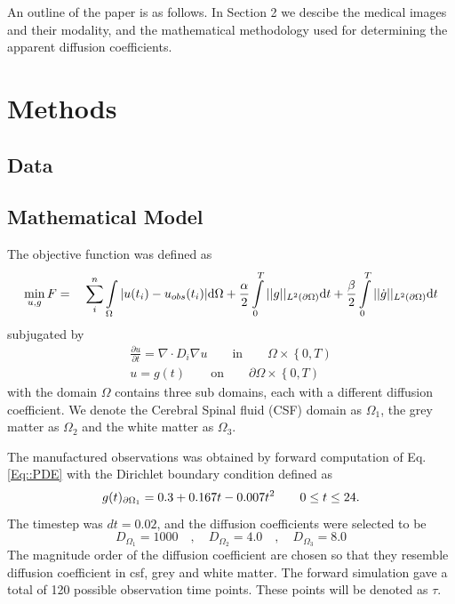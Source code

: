 \documentclass[11pt,a4paper]{article}
\begin{document}
An outline of the paper is as follows. In Section 2 we descibe the medical images and their modality,  
and the mathematical methodology used for determining the apparent diffusion coefficients.  


\section{Methods}


\subsection*{Data}


\subsection*{Mathematical Model}
The objective function was defined as 
\begin{equation}
\min_{u,g} F = \quad \sum\limits_i\sp{n} \int\limits_{\Omega} |u(t_i) - u_{obs}(t_i)| \mathrm{d}\Omega + \frac{\alpha}{2} \int\limits_{0}\sp{T} || g ||_{L\sp{2}(\partial\Omega)} \mathrm{d}t + \frac{\beta}{2} \int\limits_{0}\sp{T} || \dot{g} ||_{L\sp{2}(\partial\Omega)}\mathrm{d}t 
\end{equation}
subjugated by   
\begin{equation}
\begin{aligned}
\frac{\partial u}{\partial t} = \nabla \cdot  D_i \nabla u \qquad \text{in} \qquad \Omega \times \left\lbrace 0 , T \right)  \\
u=g(t) \qquad \text{on} \qquad \partial\Omega  \times \left\lbrace 0 , T \right) 
\end{aligned}
\label{Eq::PDE}
\end{equation}
with the domain $\Omega$ contains three sub domains, each with a different diffusion coefficient. We denote the Cerebral Spinal fluid (CSF) domain as $\Omega_1$, the grey matter as $\Omega_2$ and the white matter as $\Omega_3$.


The manufactured observations was obtained by forward computation of Eq.\ref{Eq::PDE} with the Dirichlet boundary condition defined as
\begin{equation}
g(t)_{\partial \Omega_1} = 0.3 +0.167t - 0.007t\sp{2} \qquad  0 \leq t \leq 24.
\end{equation}
The timestep was $dt = 0.02$, and the diffusion coefficients were selected to be 
\begin{equation}
D_{\Omega_1} = 1000 \quad , \quad D_{\Omega_2} = 4.0 \quad , \quad D_{\Omega_3} = 8.0 
\end{equation}  
The magnitude order of the diffusion coefficient are chosen so that they resemble diffusion coefficient in csf, grey and white matter. The forward simulation gave a total of 120 possible observation time points. These points will be denoted as $\tau$.
\end{document}
